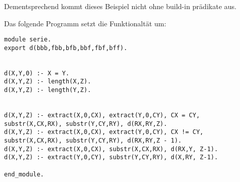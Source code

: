 \documentclass[12pt,a4paper]{amsart}
\begin{document}
Dementsprechend kommt dieses Beispiel nicht ohne build-in prädikate aus.

\medskip
\begin{aufgabe1}
\end{aufgabe1}


Das folgende Programm setzt die Funktionaltät um:

\begin{lstlisting}
module serie.
export d(bbb,fbb,bfb,bbf,fbf,bff).


d(X,Y,0) :- X = Y.
d(X,Y,Z) :- length(X,Z).
d(X,Y,Z) :- length(Y,Z).


d(X,Y,Z) :- extract(X,0,CX), extract(Y,0,CY), CX = CY, substr(X,CX,RX), substr(Y,CY,RY), d(RX,RY,Z).
d(X,Y,Z) :- extract(X,0,CX), extract(Y,0,CY), CX != CY, substr(X,CX,RX), substr(Y,CY,RY), d(RX,RY,Z - 1).
d(X,Y,Z) :- extract(X,0,CX), substr(X,CX,RX), d(RX,Y, Z-1).
d(X,Y,Z) :- extract(Y,0,CY), substr(Y,CY,RY), d(X,RY, Z-1).

end_module.
\end{lstlisting}
\end{document}

